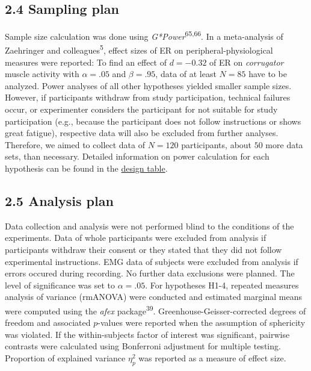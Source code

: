 \documentclass[
  man,floatsintext]{apa6}
\begin{document}
\hypertarget{sampling-plan}{%
\subsection{2.4 Sampling plan}\label{sampling-plan}}

Sample size calculation was done using \emph{G*Power}\textsuperscript{65,66}.
In a meta-analysis of Zaehringer and colleagues\textsuperscript{5}, effect sizes of ER on peripheral-physiological measures were reported:
To find an effect of \(d=-0.32\) of ER on \emph{corrugator} muscle activity with \(\alpha=.05\) and \(\beta=.95\), data of at least \(N=85\) have to be analyzed.
Power analyses of all other hypotheses yielded smaller sample sizes.
However, if participants withdraw from study participation, technical failures occur, or experimenter considers the participant for not suitable for study participation (e.g., because the participant does not follow instructions or shows great fatigue), respective data will also be excluded from further analyses.
Therefore, we aimed to collect data of \(N=120\) participants, about \(50%
\) more data sets, than necessary.
Detailed information on power calculation for each hypothesis can be found in the \protect\hyperlink{DesignTable}{design table}.

\hypertarget{analysis-plan}{%
\subsection{2.5 Analysis plan}\label{analysis-plan}}

Data collection and analysis were not performed blind to the conditions of the experiments.
Data of whole participants were excluded from analysis if participants withdraw their consent or they stated that they did not follow experimental instructions.
EMG data of subjects were excluded from analysis if errors occured during recording.
No further data exclusions were planned.
The level of significance was set to \(\alpha=.05\).
For hypotheses H1-4, repeated measures analysis of variance (rmANOVA) were conducted and estimated marginal means were computed using the \emph{afex} package\textsuperscript{39}.
Greenhouse-Geisser-corrected degrees of freedom and associated \(p\)-values were reported when the assumption of sphericity was violated.
If the within-subjects factor of interest was significant, pairwise contrasts were calculated using Bonferroni adjustment for multiple testing.
Proportion of explained variance \(\eta_{p}^{2}\) was reported as a measure of effect size.
\end{document}
